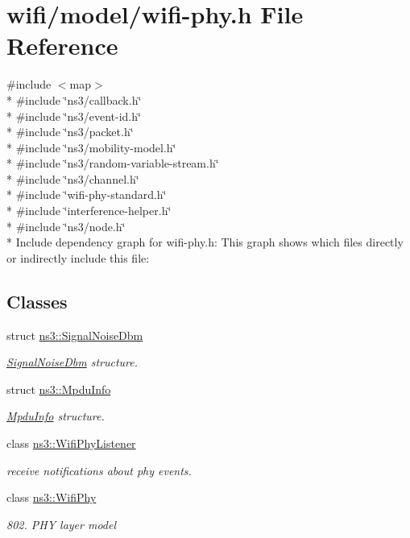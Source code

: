 \hypertarget{wifi-phy_8h}{}\section{wifi/model/wifi-\/phy.h File Reference}
\label{wifi-phy_8h}
{\ttfamily \#include $<$map$>$}\\*
{\ttfamily \#include \char`\"{}ns3/callback.\+h\char`\"{}}\\*
{\ttfamily \#include \char`\"{}ns3/event-\/id.\+h\char`\"{}}\\*
{\ttfamily \#include \char`\"{}ns3/packet.\+h\char`\"{}}\\*
{\ttfamily \#include \char`\"{}ns3/mobility-\/model.\+h\char`\"{}}\\*
{\ttfamily \#include \char`\"{}ns3/random-\/variable-\/stream.\+h\char`\"{}}\\*
{\ttfamily \#include \char`\"{}ns3/channel.\+h\char`\"{}}\\*
{\ttfamily \#include \char`\"{}wifi-\/phy-\/standard.\+h\char`\"{}}\\*
{\ttfamily \#include \char`\"{}interference-\/helper.\+h\char`\"{}}\\*
{\ttfamily \#include \char`\"{}ns3/node.\+h\char`\"{}}\\*
Include dependency graph for wifi-\/phy.h\+:
This graph shows which files directly or indirectly include this file\+:
\subsection*{Classes}
\begin{DoxyCompactItemize}
\item 
struct \hyperlink{structns3_1_1SignalNoiseDbm}{ns3\+::\+Signal\+Noise\+Dbm}
\begin{DoxyCompactList}\small\item\em \hyperlink{structns3_1_1SignalNoiseDbm}{Signal\+Noise\+Dbm} structure. \end{DoxyCompactList}\item 
struct \hyperlink{structns3_1_1MpduInfo}{ns3\+::\+Mpdu\+Info}
\begin{DoxyCompactList}\small\item\em \hyperlink{structns3_1_1MpduInfo}{Mpdu\+Info} structure. \end{DoxyCompactList}\item 
class \hyperlink{classns3_1_1WifiPhyListener}{ns3\+::\+Wifi\+Phy\+Listener}
\begin{DoxyCompactList}\small\item\em receive notifications about phy events. \end{DoxyCompactList}\item 
class \hyperlink{classns3_1_1WifiPhy}{ns3\+::\+Wifi\+Phy}
\begin{DoxyCompactList}\small\item\em 802. P\+HY layer model \end{DoxyCompactList}\end{DoxyCompactItemize}
